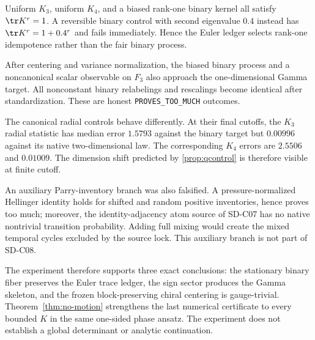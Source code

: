 Uniform $K_3$, uniform $K_4$, and a biased rank-one binary kernel all satisfy
$\tr K^r=1$. A reversible binary control with second eigenvalue $0.4$ instead
has $\tr K^r=1+0.4^r$ and fails immediately. Hence the Euler ledger selects
rank-one idempotence rather than the fair binary process.

After centering and variance normalization, the biased binary process and a
noncanonical scalar observable on $F_3$ also approach the one-dimensional
Gamma target. All nonconstant binary relabelings and rescalings become
identical after standardization. These are honest
\texttt{PROVES\_TOO\_MUCH} outcomes.

The canonical radial controls behave differently. At their final cutoffs,
the $K_3$ radial statistic has median error $1.5793$ against the binary target
but $0.00996$ against its native two-dimensional law. The corresponding
$K_4$ errors are $2.5506$ and $0.01009$. The dimension shift predicted by
\cref{prop:qcontrol} is therefore visible at finite cutoff.

An auxiliary Parry-inventory branch was also falsified. A pressure-normalized
Hellinger identity holds for shifted and random positive inventories, hence
proves too much; moreover, the identity-adjacency atom source of SD-C07 has no
native nontrivial transition probability. Adding full mixing would create the
mixed temporal cycles excluded by the source lock. This auxiliary branch is
not part of SD-C08.

The experiment therefore supports three exact conclusions: the stationary
binary fiber preserves the Euler trace ledger, the sign sector produces the
Gamma skeleton, and the frozen block-preserving chiral centering is
gauge-trivial. Theorem~\ref{thm:no-motion} strengthens the last numerical
certificate to every bounded $K$ in the same one-sided phase ansatz. The
experiment does not establish a global determinant or analytic continuation.
